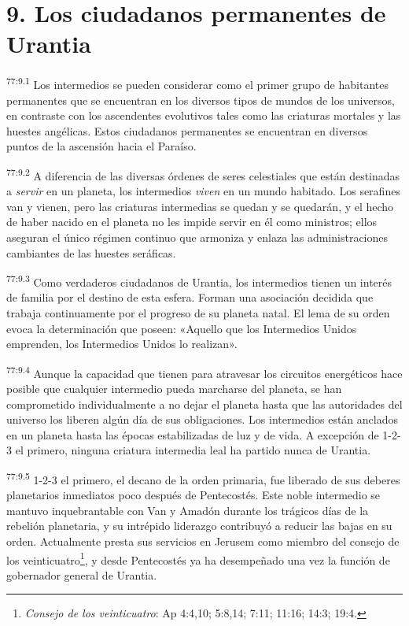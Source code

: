 \section*{9. Los ciudadanos permanentes de Urantia}
\par
\textsuperscript{77:9.1} Los intermedios se pueden considerar como el primer grupo de habitantes permanentes que se encuentran en los diversos tipos de mundos de los universos, en contraste con los ascendentes evolutivos tales como las criaturas mortales y las huestes angélicas. Estos ciudadanos permanentes se encuentran en diversos puntos de la ascensión hacia el Paraíso.

\par
\textsuperscript{77:9.2} A diferencia de las diversas órdenes de seres celestiales que están destinadas a \textit{servir} en un planeta, los intermedios \textit{viven} en un mundo habitado. Los serafines van y vienen, pero las criaturas intermedias se quedan y se quedarán, y el hecho de haber nacido en el planeta no les impide servir en él como ministros; ellos aseguran el único régimen continuo que armoniza y enlaza las administraciones cambiantes de las huestes seráficas.

\par
\textsuperscript{77:9.3} Como verdaderos ciudadanos de Urantia, los intermedios tienen un interés de familia por el destino de esta esfera. Forman una asociación decidida que trabaja continuamente por el progreso de su planeta natal. El lema de su orden evoca la determinación que poseen: «Aquello que los Intermedios Unidos emprenden, los Intermedios Unidos lo realizan».

\par
\textsuperscript{77:9.4} Aunque la capacidad que tienen para atravesar los circuitos energéticos hace posible que cualquier intermedio pueda marcharse del planeta, se han comprometido individualmente a no dejar el planeta hasta que las autoridades del universo los liberen algún día de sus obligaciones. Los intermedios están anclados en un planeta hasta las épocas estabilizadas de luz y de vida. A excepción de 1-2-3 el primero, ninguna criatura intermedia leal ha partido nunca de Urantia.

\par
\textsuperscript{77:9.5} 1-2-3 el primero, el decano de la orden primaria, fue liberado de sus deberes planetarios inmediatos poco después de Pentecostés. Este noble intermedio se mantuvo inquebrantable con Van y Amadón durante los trágicos días de la rebelión planetaria, y su intrépido liderazgo contribuyó a reducir las bajas en su orden. Actualmente presta sus servicios en Jerusem como miembro del consejo de los veinticuatro\footnote{\textit{Consejo de los veinticuatro}: Ap 4:4,10; 5:8,14; 7:11; 11:16; 14:3; 19:4.}, y desde Pentecostés ya ha desempeñado una vez la función de gobernador general de Urantia.

